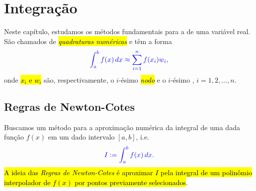 
\chapter{Integração}\label{cap_integr}
\thispagestyle{fancy}

Neste capítulo, estudamos os métodos fundamentais para a  de uma variável real. São chamados de \hl{\emph{quadraturas numéricas}} e têm a forma
\begin{equation}\color{blue}\int_a^b f(x)\,dx \approx \sum_{i=1}^n f(x_i)w_i,
\end{equation}
onde \hl{$x_i$ e $w_i$} são, respectivamente, o $i$-ésimo \hl{\emph{nodo}} e o $i$-ésimo , $i=1, 2, \dotsc, n$.

\section{Regras de Newton-Cotes}\label{cap_integr_sec_nc}

Buscamos um método para a aproximação numérica da integral de uma dada função $f(x)$ em um dado intervalo $[a, b]$, i.e.
\begin{equation}\color{blue}I := \int_a^b f(x)\,dx.
\end{equation}
\hl{A ideia das \emph{Regras de Newton-Cotes} é aproximar $I$ pela integral de um polinômio interpolador de $f(x)$ por pontos previamente selecionados}.

